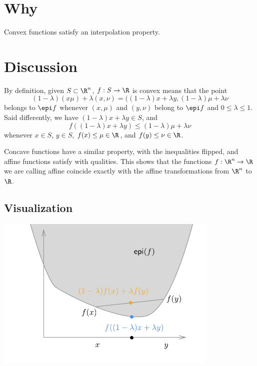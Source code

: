 
\section*{Why}

Convex functions satisfy an interpolation property.


\section*{Discussion}

By definition, given $S \subset \R ^n$, $f: S \to \R $ is convex means that the point
\[
(1 - \lambda )(x \mu ) + \lambda (x, \nu ) = ((1-\lambda )x + \lambda y, (1-\lambda )\mu  + \lambda \nu
\]
belongs to $\epi f$ whenever $(x, \mu )$ and $(y, \nu )$ belong to $\epi f$ and $0 \leq \lambda  \leq 1$.
Said differently, we have $(1-\lambda )x + \lambda y \in S$, and
\[
f((1-\lambda )x + \lambda y) \leq (1-\lambda )\mu  + \lambda \nu
\]
whenever $x \in S$, $y \in S$, $f(x) \leq \mu  \in \R $, and $f(y) \leq \nu  \in \R $.

Concave functions have a similar property, with the inequalities flipped, and affine functions satisfy with qualities.
This shows that the functions $f: \R ^n \to \R $ we are calling affine coincide exactly with the affine transformations from $\R ^n$ to $\R $.


\subsection*{Visualization}

\begin{center}\includegraphics[width=0.80\textwidth]{./graphics/cvxepi_interpolation.pdf}\end{center}
\blankpage